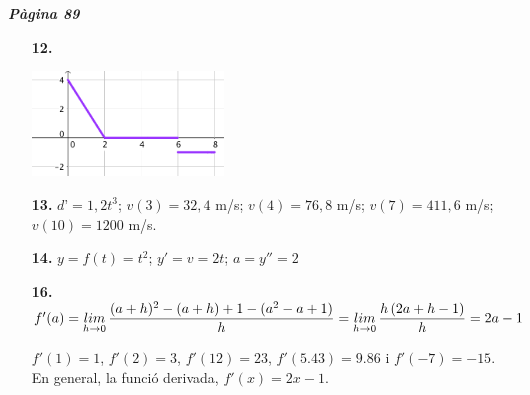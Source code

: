 \documentclass[a4paper, pdf, twoside]{book}
\begin{document}

{\textbf{\em Pàgina 89}} \hrulefill
\begin{enumerate}
\vspace{0.25cm}
\item[\fontfamily{phv}\selectfont\color{blue}\textbf{12. }] 
\mbox {}\par \includegraphics [width=0.4\textwidth ]{img-sol/t7-12}
 \end{enumerate}
\begin{enumerate}
\vspace{0.25cm}
\item[\fontfamily{phv}\selectfont\color{blue}\textbf{13. }] 
 $d’ = 1,2 t^3$; $v(3) = 32,4$ m/s; $v(4) = 76,8$ m/s; $v(7) = 411,6$ m/s; $v(10) = 1200$ m/s.
\vspace{0.25cm}
\item[\fontfamily{phv}\selectfont\color{blue}\textbf{14. }] 
$y = f(t) = t^2$; $y' = v = 2t$; $a = y'' = 2$
\vspace{0.25cm}
\item[\fontfamily{phv}\selectfont\color{blue}\textbf{16. }] 
$f'(a)=\limx [h]{0} {\dfrac {(a+h)^2-(a+h)+1 -(a^2-a+1)}{h}=\limx [h]{0} \dfrac {h\,(2a+h-1)}{h}=2a-1}$\par $f'(1)=1$, $f'(2)=3$, $f'(12)=23$, $f'(5.43)=9.86$ i $f'(-7)=-15$. En general, la funció derivada, $f'(x)=2x-1$.
 \end{enumerate}
\vspace{0.3cm}

\end{document}
